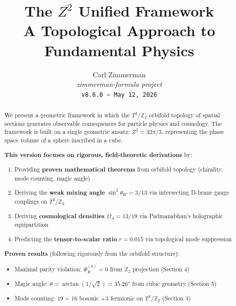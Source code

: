 \documentclass[12pt,a4paper]{article}
\newcommand{\Ztwo}{\mathbb{Z}_2}
\newcommand{\Tthree}{T^3}
\newcommand{\OmegaL}{\Omega_\Lambda}
\newcommand{\sinW}{\sin^2\theta_W}
\newcommand{\Zsq}{Z^2}
\begin{document}
\title{\textbf{The $Z^2$ Unified Framework}\\[0.5em]
\large A Topological Approach to Fundamental Physics}

\author{Carl Zimmerman\\[0.5em]
\small\textit{zimmerman-formula project}\\
\small\texttt{v8.6.0 --- May 12, 2026}}

\date{}

\maketitle

\begin{abstract}

We present a geometric framework in which the $\Tthree/\Ztwo$ orbifold topology of spatial sections generates observable consequences for particle physics and cosmology. The framework is built on a single geometric ansatz: $\Zsq = 32\pi/3$, representing the phase space volume of a sphere inscribed in a cube.

\textbf{This version focuses on rigorous, field-theoretic derivations} by:
\begin{enumerate}[itemsep=0pt]
    \item Providing \textbf{proven mathematical theorems} from orbifold topology (chirality, mode counting, magic angle)
    \item Deriving the \textbf{weak mixing angle} $\sinW = 3/13$ via intersecting D-brane gauge couplings on $\Tthree/\Ztwo$
    \item Deriving \textbf{cosmological densities} $\OmegaL = 13/19$ via Padmanabhan's holographic equipartition
    \item Predicting the \textbf{tensor-to-scalar ratio} $r = 0.015$ via topological mode suppression
\end{enumerate}

\textbf{Proven results} (following rigorously from the orbifold structure):
\begin{itemize}[itemsep=0pt]
    \item Maximal parity violation: $\Psi_R^{(0)} = 0$ from $\Ztwo$ projection (Section 4)
    \item Magic angle: $\theta = \arctan(1/\sqrt{2}) = 35.26°$ from cubic geometry (Section 5)
    \item Mode counting: $19 = 16$ bosonic $+ 3$ fermionic on $\Tthree/\Ztwo$ (Section 3)
\end{itemize}


\end{abstract}
\end{document}

